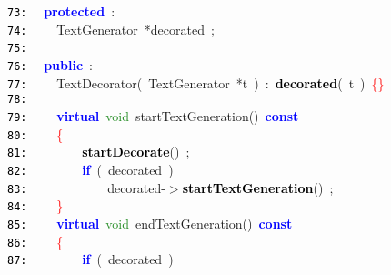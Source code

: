 \documentclass{article}
\begin{document}
\mbox{}\texttt{\textcolor{Black}{73:}} \ \ \textbf{\textcolor{Blue}{protected}}\ \textcolor{BrickRed}{:} \\
\mbox{}\texttt{\textcolor{Black}{74:}} \ \ \ \ TextGenerator\ \textcolor{BrickRed}{*}\label{test.h:74}decorated\ \textcolor{BrickRed}{;} \\
\mbox{}\texttt{\textcolor{Black}{75:}} \ \  \\
\mbox{}\texttt{\textcolor{Black}{76:}} \ \ \textbf{\textcolor{Blue}{public}}\ \textcolor{BrickRed}{:} \\
\mbox{}\texttt{\textcolor{Black}{77:}} \ \ \ \ \label{test.h:77}TextDecorator\textcolor{BrickRed}{(}\ TextGenerator\ \textcolor{BrickRed}{*}t\ \textcolor{BrickRed}{)}\ \textcolor{BrickRed}{:}\ \textbf{\textcolor{Black}{decorated}}\textcolor{BrickRed}{(}\ t\ \textcolor{BrickRed}{)}\ \textcolor{Red}{\{\}} \\
\mbox{}\texttt{\textcolor{Black}{78:}}  \\
\mbox{}\texttt{\textcolor{Black}{79:}} \ \ \ \ \textbf{\textcolor{Blue}{virtual}}\ \textcolor{ForestGreen}{void}\ \label{test.h:79}startTextGeneration\textcolor{BrickRed}{()}\ \textbf{\textcolor{Blue}{const}}\  \\
\mbox{}\texttt{\textcolor{Black}{80:}} \ \ \ \ \textcolor{Red}{\{}\  \\
\mbox{}\texttt{\textcolor{Black}{81:}} \ \ \ \ \ \ \ \ \textbf{\textcolor{Black}{startDecorate}}\textcolor{BrickRed}{()}\ \textcolor{BrickRed}{;} \\
\mbox{}\texttt{\textcolor{Black}{82:}} \ \ \ \ \ \ \ \ \textbf{\textcolor{Blue}{if}}\ \textcolor{BrickRed}{(}\ decorated\ \textcolor{BrickRed}{)} \\
\mbox{}\texttt{\textcolor{Black}{83:}} \ \ \ \ \ \ \ \ \ \ \ \ decorated\textcolor{BrickRed}{-$>$}\textbf{\textcolor{Black}{startTextGeneration}}\textcolor{BrickRed}{()}\ \textcolor{BrickRed}{;} \\
\mbox{}\texttt{\textcolor{Black}{84:}} \ \ \ \ \textcolor{Red}{\}} \\
\mbox{}\texttt{\textcolor{Black}{85:}} \ \ \ \ \textbf{\textcolor{Blue}{virtual}}\ \textcolor{ForestGreen}{void}\ \label{test.h:85}endTextGeneration\textcolor{BrickRed}{()}\ \textbf{\textcolor{Blue}{const}}\  \\
\mbox{}\texttt{\textcolor{Black}{86:}} \ \ \ \ \textcolor{Red}{\{}\  \\
\mbox{}\texttt{\textcolor{Black}{87:}} \ \ \ \ \ \ \ \ \textbf{\textcolor{Blue}{if}}\ \textcolor{BrickRed}{(}\ decorated\ \textcolor{BrickRed}{)} \\
\end{document}
